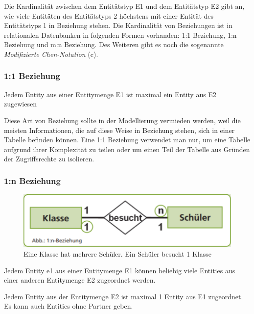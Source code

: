  Die Kardinalität zwischen dem Entitätstyp E1 und dem Entitätstyp E2 gibt an, wie viele Entitäten des Entitätstyps 2 höchstens mit einer Entität des Entitätstyps 1 in Beziehung stehen. Die Kardinalität von Beziehungen ist in relationalen Datenbanken in folgenden Formen vorhanden: 
 1:1 Beziehung, 1:n Beziehung und m:n Beziehung. Des Weiteren gibt es noch die sogenannte \emph{Modifizierte Chen-Notation} (c).
 
 \subsubsection{1:1 Beziehung}

 Jedem Entity aus einer Entitymenge E1 ist maximal ein Entity aus E2 zugewiesen

Diese Art von Beziehung sollte in der Modellierung vermieden werden, weil die meisten Informationen, die auf diese Weise in Beziehung stehen, sich in einer Tabelle befinden können. Eine 1:1 Beziehung verwendet man nur, um eine Tabelle aufgrund ihrer Komplexität zu teilen oder um einen Teil der Tabelle aus Gründen der Zugriffsrechte zu isolieren.


 \subsubsection{1:n Beziehung}

 \begin{figure}
    \begin{center}
        \includegraphics[width=.38\textwidth]{Content/images/modellierung/1n.png}
    \end{center}
    \caption{Eine Klasse hat mehrere Schüler. Ein Schüler besucht 1 Klasse}
    \label{fig:modellierung:1n}
\end{figure}
Jedem Entity e1 aus einer Entitymenge E1 können beliebig viele Entities aus einer anderen Entitymenge E2 zugeordnet werden.

Jedem Entity aus der Entitymenge E2 ist maximal 1 Entity aus E1 zugeordnet.
Es kann auch Entities ohne Partner geben.

